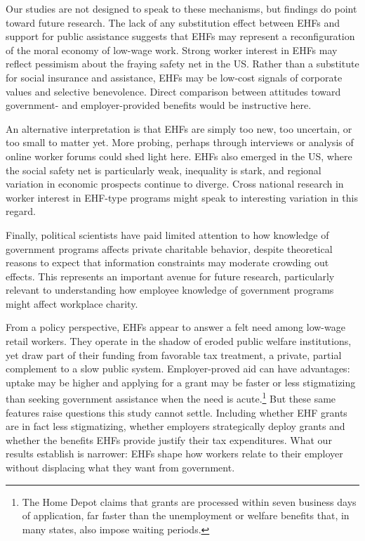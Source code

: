 \documentclass[
  11pt,
  oneside]{article}
\begin{document}
Our studies are not designed to speak to these mechanisms, but findings do point toward future research. The lack of any substitution effect between EHFs and support for public assistance suggests that EHFs may represent a reconfiguration of the moral economy of low-wage work. Strong worker interest in EHFs may reflect pessimism about the fraying safety net in the US. Rather than a substitute for social insurance and assistance, EHFs may be low-cost signals of corporate values and selective benevolence. Direct comparison between attitudes toward government- and employer-provided benefits would be instructive here.

An alternative interpretation is that EHFs are simply too new, too uncertain, or too small to matter yet. More probing, perhaps through interviews or analysis of online worker forums could shed light here. EHFs also emerged in the US, where the social safety net is particularly weak, inequality is stark, and regional variation in economic prospects continue to diverge. Cross national research in worker interest in EHF-type programs might speak to interesting variation in this regard.

Finally, political scientists have paid limited attention to how knowledge of government programs affects private charitable behavior, despite theoretical reasons to expect that information constraints may moderate crowding out effects. This represents an important avenue for future research, particularly relevant to understanding how employee knowledge of government programs might affect workplace charity.

From a policy perspective, EHFs appear to answer a felt need among low-wage retail workers. They operate in the shadow of eroded public welfare institutions, yet draw part of their funding from favorable tax treatment, a private, partial complement to a slow public system. Employer-proved aid can have advantages: uptake may be higher and applying for a grant may be faster or less stigmatizing than seeking government assistance when the need is acute.\footnote{The Home Depot claims that grants are processed within seven business days of application, far faster than the unemployment or welfare benefits that, in many states, also impose waiting periods.} But these same features raise questions this study cannot settle. Including whether EHF grants are in fact less stigmatizing, whether employers strategically deploy grants and whether the benefits EHFs provide justify their tax expenditures. What our results establish is narrower: EHFs shape how workers relate to their employer without displacing what they want from government.
\end{document}
